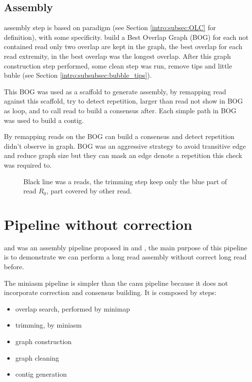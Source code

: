 \documentclass[main]{subfiles}
\begin{document}
\subsection{Assembly}

\canu assembly step is based on \OLC paradigm (see Section \ref{intro:subsec:OLC} for \OLC definition), with some specificity. \canu build a Best Overlap Graph (BOG) for each not contained read only two overlap are kept in the graph, the best overlap for each read extremity, in \canu the best overlap was the longest overlap. After this graph construction step performed, some clean step was run, remove tips and little buble (see Section \ref{intro:subsubsec:bubble_tips}).

This BOG was used as a scaffold to generate assembly, by remapping read against this scaffold, \canu try to detect repetition, larger than read not show in BOG as loop, and to call read to build a consensus after. Each simple path in BOG was used to build a contig. 

By remapping reads on the BOG \canu can build a consensus and detect repetition didn't observe in graph. BOG was an aggressive strategy to avoid transitive edge and reduce graph size but they can mask an edge denote a repetition this check was required to.

\begin{figure}[ht]
    \centering
    
    \caption{Black line was a reads, the \canu trimming step keep only the blue part of read $R_0$, part covered by other read.}
    \label{sota:fig:canu:remapping}
\end{figure}

\section{Pipeline without correction \miniasm} \label{section:sota:miniasm}

\minimap and \miniasm was an assembly pipeline proposed in \cite{miniasm_minimap} and \cite{minimap2}, the main purpose of this pipeline is to demonstrate we can perform a long read assembly without correct long read before.

The miniasm pipeline is simpler than the canu pipeline because it does not incorporate correction and consensus building. It is composed by steps:
\begin{itemize}
    \item overlap search, performed by minimap
    \item trimming, by miniasm
    \item graph construction 
    \item graph cleaning
    \item contig generation
\end{itemize}
\end{document}
